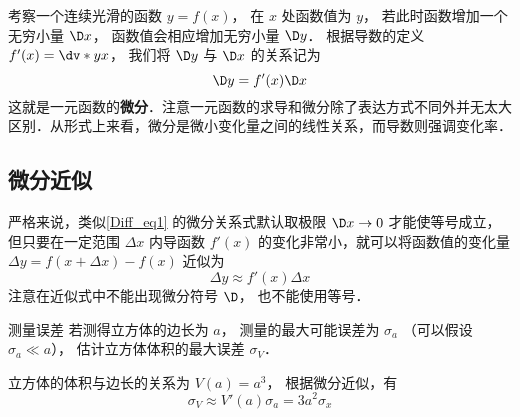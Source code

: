 

考察一个连续光滑的函数 $y = f\left( x \right)$， 在 ${x}$ 处函数值为 ${y}$， 若此时函数增加一个无穷小量 $\D x$， 函数值会相应增加无穷小量 $\D y$． 根据导数的定义 $f'({{x}}) = \dv*{y}{x}$， 我们将 $\D y$ 与 $\D x$ 的关系记为
\begin{equation}\label{Diff_eq1}
\D y = f'(x)\D x
\end{equation}
这就是一元函数的\textbf{微分}．注意一元函数的求导和微分除了表达方式不同外并无太大区别．从形式上来看，微分是微小变化量之间的线性关系，而导数则强调变化率．

\subsection{微分近似}
严格来说，类似\autoref{Diff_eq1} 的微分关系式默认取极限 $\D x \to 0$ 才能使等号成立，但只要在一定范围 $\Delta x$ 内导函数 $f'(x)$ 的变化非常小，就可以将函数值的变化量 $\Delta y = f(x+\Delta x)-f(x)$ 近似为
\begin{equation}
\Delta y \approx f'(x) \Delta x
\end{equation}
注意在近似式中不能出现微分符号 $\D$， 也不能使用等号．

\begin{exam}{测量误差}\label{Diff_ex1}
若测得立方体的边长为 $a$， 测量的最大可能误差为 $\sigma_a$ （可以假设 $\sigma_a \ll a$）， 估计立方体体积的最大误差 $\sigma_V$．

立方体的体积与边长的关系为 $V(a)=a^3$， 根据微分近似，有
\begin{equation}
\sigma_V \approx V'(a) \sigma_a = 3a^2 \sigma_x
\end{equation}
\end{exam}




